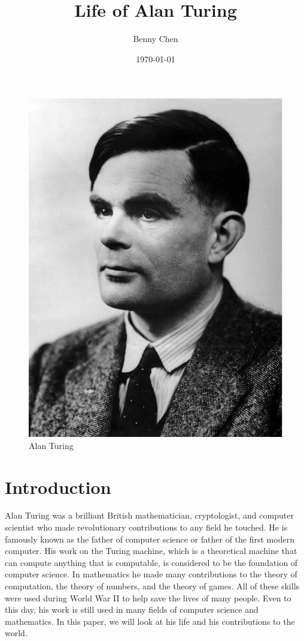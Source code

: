 \documentclass[12pt]{article}
\title{Life of Alan Turing}
\author{Benny Chen}
\date{\today}
\begin{document}
\maketitle

\begin{figure}[h]
    \centering
    \includegraphics[scale=.4]{images/Alan.png}
    \caption{Alan Turing}
\end{figure}

\section*{Introduction}
Alan Turing was a brilliant British mathematician, cryptologist, and computer scientist
who made revolutionary contributions to any field he touched.
He is famously known as the father of computer science or father of the first modern computer.
His work on the Turing machine, which is a theoretical machine that can compute anything 
that is computable, is considered to be the foundation of computer science.
In mathematics he made many contributions to the theory of computation, the theory of numbers, and the theory of games. 
All of these skills were used during World War II to help save the lives of many people.
Even to this day, his work is still used in many fields of computer science and mathematics.
In this paper, we will look at his life and his contributions to the world.
\end{document}
